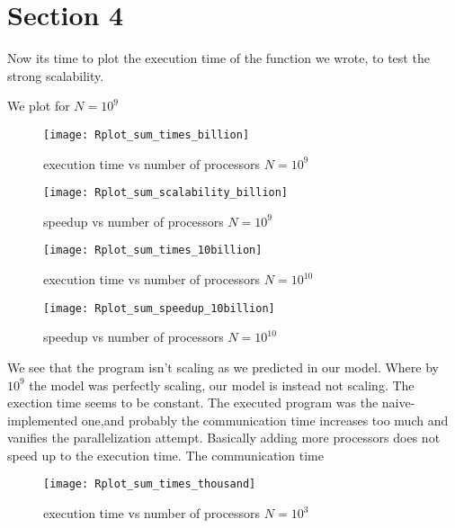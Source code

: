 \documentclass[11pt]{scrartcl} %
\begin{document}
\section{Section 4}
Now its time to plot the execution time of the function we wrote, to test the strong scalability.

We plot for $N=10^9$

\begin{figure}[H] %
	\centering
	\texttt{[image: Rplot\_sum\_times\_billion]} %
	\caption{execution time vs number of processors $N= 10^9$}
\end{figure}
\begin{figure}[H] %
	\centering
	\texttt{[image: Rplot\_sum\_scalability\_billion]} %
	\caption{speedup vs number of processors $N= 10^9$}
\end{figure}

\begin{figure}[H] %
	\centering
	\texttt{[image: Rplot\_sum\_times\_10billion]} %
	\caption{execution time vs number of processors $N= 10^{10}$}
\end{figure}
\begin{figure}[H] %
	\centering
	\texttt{[image: Rplot\_sum\_speedup\_10billion]} %
	\caption{speedup vs number of processors $N= 10^{10}$}
\end{figure}

We see that the program isn't scaling as we predicted in our model.
Where by $10^9$ the model was perfectly scaling, our model is instead not scaling.
The exection time seems to be constant.
The executed program was the naive-implemented one,and probably the communication time increases too much and vanifies the parallelization attempt.
Basically adding more processors does not speed up to the execution time.
The communication time
\begin{figure}[H] %
	\centering
	\texttt{[image: Rplot\_sum\_times\_thousand]} %
	\caption{execution time vs number of processors $N= 10^3$}
\end{figure}
\end{document}
